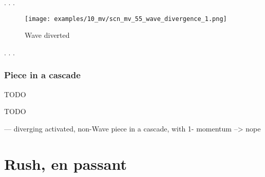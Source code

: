 \vspace*{-0.4\baselineskip}
. . .

\clearpage %

\vspace*{-2.1\baselineskip}
\noindent
\begin{figure}[!h]
\texttt{[image: examples/10\_mv/scn\_mv\_55\_wave\_divergence\_1.png]}
\vspace*{-1.3\baselineskip}
\caption{Wave diverted}
\label{fig:scn_mv_55_wave_divergence_1}
\end{figure}

\vspace*{-0.4\baselineskip}
. . .

\clearpage %

\subsubsection*{Piece in a cascade}
\label{sec:Miranda's veil/Wave/Divergence/Piece in a cascade}

\huge
TODO
\normalsize

\clearpage %


\huge
TODO
\normalsize

--- diverging activated, non-Wave piece in a cascade, with 1- momentum --> nope

\clearpage %

\section*{Rush, en passant}
\label{sec:Miranda's veil/Rush, en passant}

